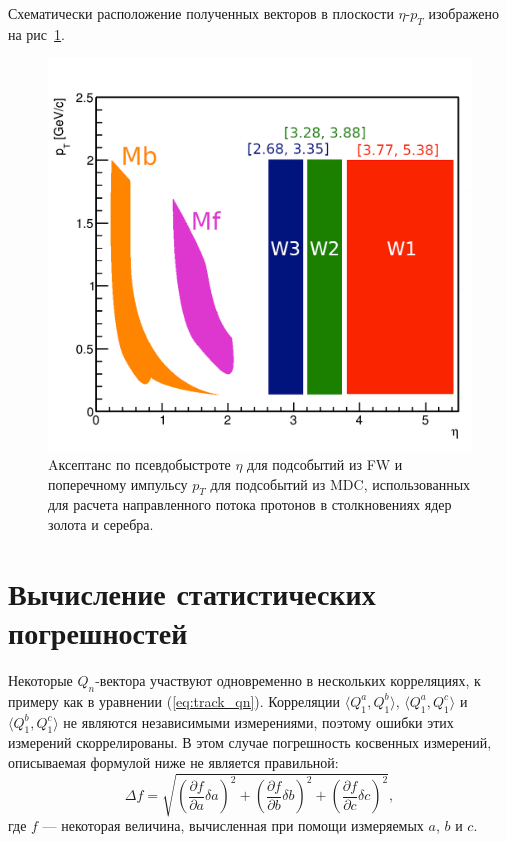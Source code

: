 Схематически расположение полученных векторов в плоскости $\eta$-$p_T$ изображено на рис~\ref{fig:hades_qvectors}.
%
\begin{figure}[ht]
\begin{center}
\includegraphics[width=0.75\linewidth]{images/eta_pt_qvectors.png}
\caption{Aксептанс по псевдобыстроте $\eta$ для подсобытий из FW и поперечному импульсу $p_T$ для подсобытий из MDC, использованных для расчета направленного потока протонов в столкновениях ядер золота и серебра.}
\label{fig:hades_qvectors}
\end{center}
\end{figure}
%

\section{Вычисление статистических погрешностей}

Некоторые $Q_n$-вектора участвуют одновременно в нескольких корреляциях, к примеру как в уравнении (\ref{eq:track_qn}).
Корреляции $\langle Q_1^a, Q_1^b \rangle$, $\langle Q_1^a, Q_1^c \rangle$ и $\langle Q_1^b, Q_1^c \rangle$ не являются независимыми измерениями, поэтому ошибки этих измерений скоррелированы.
В этом случае погрешность косвенных измерений, описываемая формулой ниже не является правильной:
\begin{equation}
    \Delta f = \sqrt{ ( \frac{\partial f}{\partial a} \delta a )^2 + (\frac{\partial f}{\partial b} \delta b )^2 + (\frac{\partial f}{\partial c} \delta c )^2 },
\end{equation}
где $f$ --- некоторая величина, вычисленная при помощи измеряемых $a$, $b$ и $c$.

